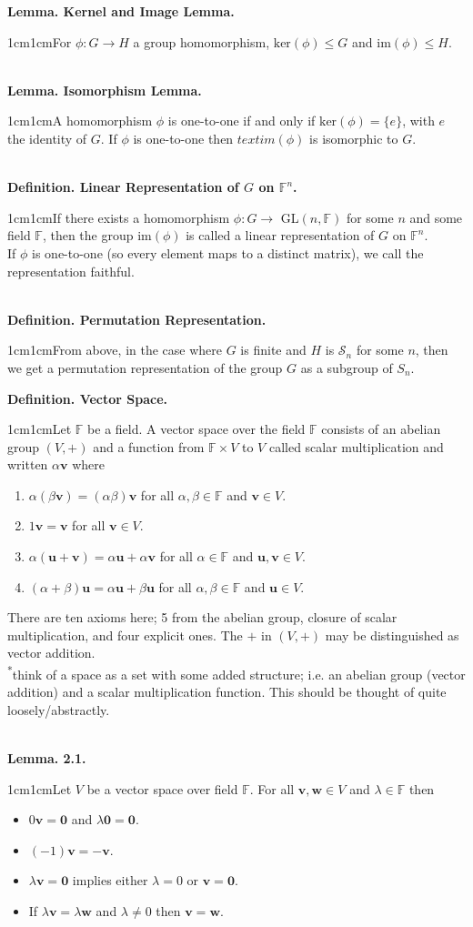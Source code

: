 \documentclass{article}
\newcommand{\vect}[1]{\mathbf{#1}}
\newcommand{\definition}[2]{\textbf{Definition. #1.}\begin{adjustwidth}{1cm}{1cm}#2\end{adjustwidth}}
\newcommand{\lemma}[2]{\textbf{Lemma. #1.}\begin{adjustwidth}{1cm}{1cm}#2\end{adjustwidth}}
\begin{document}
\lemma{Kernel and Image Lemma}{For $\phi : G \rightarrow H$ a group homomorphism, $\text{ker}(\phi) \leq G$ and $\text{im}(\phi) \leq H$.}~\\
\lemma{Isomorphism Lemma}{A homomorphism $\phi$ is one-to-one if and only if $\text{ker}(\phi) = \{e\}$, with $e$ the identity of $G$. If $\phi$ is one-to-one then $text{im}(\phi)$ is isomorphic to $G$.}~\\
\definition{Linear Representation of $G$ on $\mathbb{F}^n$}{If there exists a homomorphism $\phi : G \rightarrow$ GL$(n, \mathbb{F})$ for some $n$ and some field $\mathbb{F}$, then the group im$(\phi)$ is called a linear representation of $G$ on $\mathbb{F}^n$.\\If $\phi$ is one-to-one (so every element maps to a distinct matrix), we call the representation faithful.}~\\
\definition{Permutation Representation}{From above, in the case where $G$ is finite and $H$ is $\mathcal{S}_n$ for some $n$, then we get a permutation representation of the group $G$ as a subgroup of $S_n$.}\newpage
\definition{Vector Space}{Let $\mathbb{F}$ be a field. A vector space over the field $\mathbb{F}$ consists of an abelian group $(V, +)$ and a function from $\mathbb{F} \times V$ to $V$ called scalar multiplication and written $\alpha \vect{v}$ where \begin{enumerate} \item $\alpha(\beta \vect{v}) = (\alpha \beta)\vect{v}$ for all $\alpha, \beta \in \mathbb{F}$ and $\vect{v} \in V$. \item $1\vect{v} = \vect{v}$ for all $\vect{v} \in V$. \item $\alpha (\vect{u} + \vect{v}) = \alpha \vect{u} + \alpha \vect{v}$ for all $\alpha \in \mathbb{F}$ and $\vect{u}, \vect{v} \in V$. \item $(\alpha + \beta) \vect{u} = \alpha \vect{u} + \beta \vect{u}$ for all $\alpha, \beta \in \mathbb{F}$ and $\vect{u} \in V$.\end{enumerate}There are ten axioms here; 5 from the abelian group, closure of scalar multiplication, and four explicit ones. The $+$ in $(V, +)$ may be distinguished as vector addition.\\[1\baselineskip]\textsuperscript{*}think of a space as a set with some added structure; i.e. an abelian group (vector addition) and a scalar multiplication function. This should be thought of quite loosely/abstractly.}~\\
\lemma{2.1}{Let $V$ be a vector space over field $\mathbb{F}$. For all $\vect{v}, \vect{w} \in V$ and $\lambda \in \mathbb{F}$ then \begin{itemize}
  \item $0\vect{v} = \vect{0}$ and $\lambda \vect{0} = \vect{0}$.
  \item $(-1)\vect{v} = -\vect{v}$.
  \item $\lambda \vect{v} = \vect{0}$ implies either $\lambda = 0$ or $\vect{v} = \vect{0}$.
  \item If $\lambda \vect{v} = \lambda \vect{w}$ and $\lambda \neq 0$ then $\vect{v} = \vect{w}$.
\end{itemize}}~\\
\end{document}
